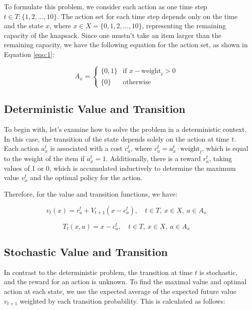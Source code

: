 To formulate this problem, we consider each action as one time step $t \in T: \{1, 2, \ldots, 10\}$. The action set for each time step depends only on the time and the state $x$, where $x \in X = \{0, 1, 2, \ldots, 10\}$, representing the remaining capacity of the knapsack. Since one mustn't take an item larger than the remaining capacity, we have the following equation for the action set, as shown in Equation \ref{eqo:1}:

\begin{equation}
\label{eqo:1}
A_x = 
\begin{cases}
    \{0, 1\} & \text{if } x - \text{weight}_t > 0 \\
    \{0\} & \text{otherwise}
\end{cases}
\end{equation}

\subsection{Deterministic Value and Transition}

To begin with, let's examine how to solve the problem in a deterministic context. In this case, the transition of the state depends solely on the action at time $t$. Each action $a^t_x$ is associated with a cost $c^t_a$, where $c^t_a = a^t_x \cdot \text{weight}_t$, which is equal to the weight of the item if $a^t_x = 1$. Additionally, there is a reward $r^t_a$, taking values of 1 or 0, which is accumulated inductively to determine the maximum value $v^t_x$ and the optimal policy for the action.

Therefore, for the value and transition functions, we have:

\begin{equation}
v_t(x) = r^t_a + V_{t+1}(x - c^t_a), \quad t \in T, \ x \in X, \ a \in A_x
\end{equation}

\begin{equation}
T_t(x, a) = x - c^t_a, \quad t \in T, \ x \in X, \ a \in A_x
\end{equation}

\subsection{Stochastic Value and Transition}

In contrast to the deterministic problem, the transition at time $t$ is stochastic, and the reward for an action is unknown. To find the maximal value and optimal action at each state, we use the expected average of the expected future value $v_{t+1}$ weighted by each transition probability. This is calculated as follows:

